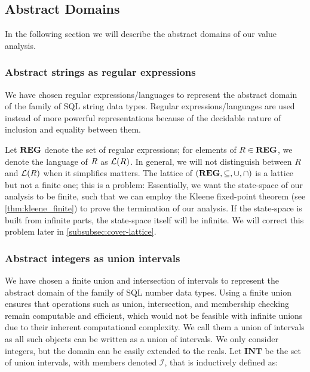 \subsection{Abstract Domains}\label{subsec:abstract-domains}

In the following section we will describe the abstract domains of our value analysis.

\subsubsection{Abstract strings as regular expressions}\label{subsubsec:abstract_domains_strings}
We have chosen regular expressions/languages to represent the abstract domain of the family of SQL string data types.
Regular expressions/languages are used instead of more powerful representations because of the decidable nature of inclusion and equality between them.

Let $\mathbf{REG}$ denote the set of regular expressions; for elements of $R \in \mathbf{REG}$, we denote the language of $R$ as $\mathcal{L}(R)$.
In general, we will not distinguish between $R$ and $\mathcal{L}(R)$ when it simplifies matters.
The lattice of $(\mathbf{REG}, \subseteq, \cup, \cap)$ is a lattice but not a finite one; this is a problem: Essentially, we want the state-space of our analysis to be finite, such that we can employ the Kleene fixed-point theorem (see \autoref{thm:kleene_finite}) to prove the termination of our analysis.
If the state-space is built from infinite parts, the state-space itself will be infinite.
We will correct this problem later in \autoref{subsubsec:cover-lattice}.

\subsubsection{Abstract integers as union intervals}\label{subsubsec:abstract_domains_numbers}
We have chosen a finite union and intersection of intervals to represent the abstract domain of the family of SQL number data types.
Using a finite union ensures that operations such as union, intersection, and membership checking remain computable and efficient, which would not be feasible with infinite unions due to their inherent computational complexity.
We call them a union of intervals as all such objects can be written as a union of intervals.
We only consider integers, but the domain can be easily extended to the reals.
Let $\mathbf{INT}$ be the set of union intervals, with members denoted $\mathscr{I}$, that is inductively defined as:


